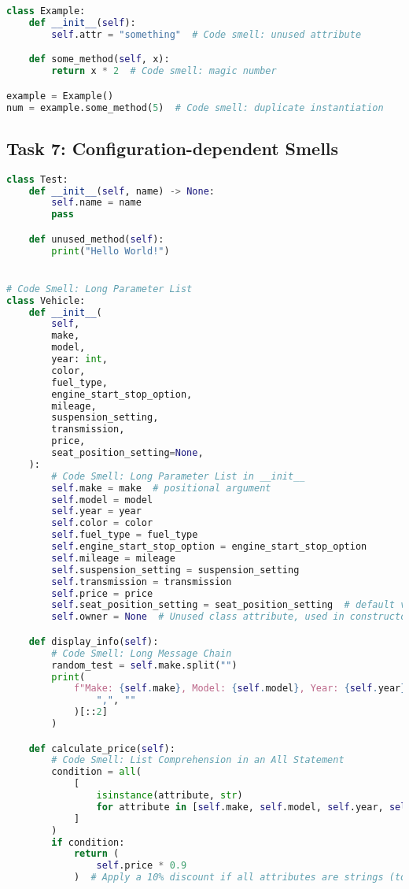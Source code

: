 \documentclass{article}
\begin{document}
\begin{lstlisting}[language=Python,caption={DMain File (main.py)},label=lst:task6b]
class Example:
    def __init__(self):
        self.attr = "something"  # Code smell: unused attribute

    def some_method(self, x):
        return x * 2  # Code smell: magic number

example = Example()
num = example.some_method(5)  # Code smell: duplicate instantiation
\end{lstlisting}

\subsection{Task 7: Configuration-dependent Smells}
\begin{lstlisting}[language=Python,caption={Complex Class Structures (sample.py)},label=lst:task7]
class Test:
    def __init__(self, name) -> None:
        self.name = name
        pass

    def unused_method(self):
        print("Hello World!")


# Code Smell: Long Parameter List
class Vehicle:
    def __init__(
        self,
        make,
        model,
        year: int,
        color,
        fuel_type,
        engine_start_stop_option,
        mileage,
        suspension_setting,
        transmission,
        price,
        seat_position_setting=None,
    ):
        # Code Smell: Long Parameter List in __init__
        self.make = make  # positional argument
        self.model = model
        self.year = year
        self.color = color
        self.fuel_type = fuel_type
        self.engine_start_stop_option = engine_start_stop_option
        self.mileage = mileage
        self.suspension_setting = suspension_setting
        self.transmission = transmission
        self.price = price
        self.seat_position_setting = seat_position_setting  # default value
        self.owner = None  # Unused class attribute, used in constructor

    def display_info(self):
        # Code Smell: Long Message Chain
        random_test = self.make.split("")
        print(
            f"Make: {self.make}, Model: {self.model}, Year: {self.year}".upper().replace(
                ",", ""
            )[::2]
        )

    def calculate_price(self):
        # Code Smell: List Comprehension in an All Statement
        condition = all(
            [
                isinstance(attribute, str)
                for attribute in [self.make, self.model, self.year, self.color]
            ]
        )
        if condition:
            return (
                self.price * 0.9
            )  # Apply a 10% discount if all attributes are strings (totally arbitrary condition)


\end{lstlisting}
\end{document}
